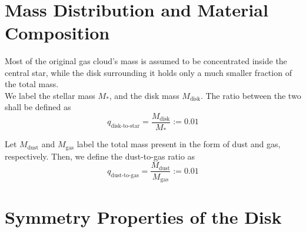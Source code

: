      \\

\section{Mass Distribution and Material Composition}

   Most of the original gas cloud's mass is assumed to be concentrated inside the central star,
   while the disk surrounding it holds only a much smaller fraction of the total mass. \\ 

   We label the stellar mass $M_*$, and the disk mass $M_\text{disk}$. 
   The ratio between the two shall be defined as
   \begin{equation}
       q_\text{disk-to-star}
           =\frac{M_\text{disk}}{M_*}  
           :=0.01
   \end{equation}

    Let $M_\text{dust}$ and $M_\text{gas}$ label the total mass present in the form of dust and 
    gas, respectively. Then, we define the dust-to-gas ratio as 
    \begin{equation}
        q_\text{dust-to-gas}=\frac{M_\text{dust}}{M_\text{gas}}:=0.01
    \end{equation}

\section{Symmetry Properties of the Disk}  

     \\

     \\

     \\
     \\

     \\

